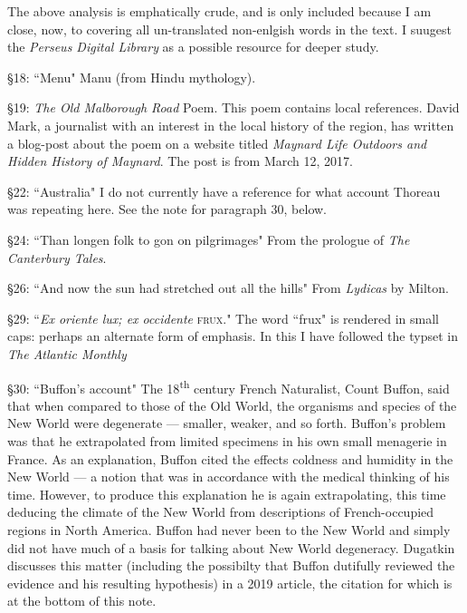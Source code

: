 \documentclass[twoside,openright,10pt]{memoir} %
\begin{document}
The above analysis is emphatically crude, and is only included because I am close, now, to covering all un-translated non-enlgish words in the text. I suugest the \emph{Perseus Digital Library} as a possible resource for deeper study.

§18: “Menu"\newline
Manu (from Hindu mythology).

§19: \emph{The Old Malborough Road} Poem.\newline
This poem contains local references. David Mark, a journalist with an interest in the local history of the region, has written a blog-post about the poem on a website titled \emph{Maynard Life Outdoors and Hidden History of Maynard}. The post is from March 12, 2017.

§22: “Australia"\newline
I do not currently have a reference for what account Thoreau was repeating here. See the note for paragraph 30, below.

§24: “Than longen folk to gon on pilgrimages"\newline
From the prologue of \emph{The Canterbury Tales}.

§26: “And now the sun had stretched out all the hills"\newline
From \emph{Lydicas} by Milton.

§29: “\emph{Ex oriente lux; ex occidente} \textsc{frux}."\newline
The word “frux" is rendered in small caps: perhaps an alternate form of emphasis. In this I have followed the typset in \emph{The Atlantic Monthly}

§30: “Buffon’s account"\newline
The 18\textsuperscript{th} century French Naturalist, Count Buffon, said that when compared to those of the Old World, the organisms and species of the New World were degenerate — smaller, weaker, and so forth. Buffon's problem was that he extrapolated from limited specimens in his own small menagerie in France. As an explanation, Buffon cited the effects coldness and humidity in the New World — a notion that was in accordance with the medical thinking of his time. However, to produce this explanation he is again extrapolating, this time deducing the climate of the New World from descriptions of French-occupied regions in North America. Buffon had never been to the New World and simply did not have much of a basis for talking about New World degeneracy. Dugatkin discusses this matter (including the possibilty that Buffon dutifully reviewed the evidence and his resulting hypothesis) in a 2019 article, the citation for which is at the bottom of this note.
\end{document}
